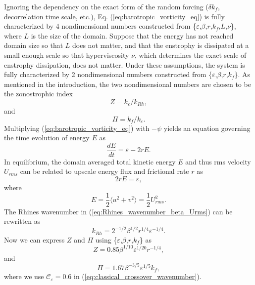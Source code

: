 \documentclass{ametsoc}
\begin{document}
Ignoring the dependency on the exact form of the random forcing 
($\delta k_f$, decorrelation time scale, etc.), Eq.
(\ref{eq:barotropic_vorticity_eq}) is fully characterized by 4 nondimensional
numbers constructed from \{$\varepsilon$,$\beta$,$r$,$k_{f}$,$L$,$\nu$\},
where $L$ is the size of the domain. Suppose that the energy has
not reached domain size so that $L$ does not matter, and that the
enstrophy is dissipated at a small enough scale so that hyperviscosity
$\nu$, which determines the exact scale of enstrophy dissipation,
does not matter. Under these assumptions, the system is fully characterized
by 2 nondimensional numbers constructed from \{$\varepsilon$,$\beta$,$r$,$k_{f}$\}.
As mentioned in the introduction, the two nondimensional numbers
are chosen to be the zonostrophic index 
\begin{equation}
Z=k_{\varepsilon}/k_{Rh},\label{eq:zono_idx_estimate}
\end{equation}
and
\[
\Pi=k_{f}/k_{\varepsilon}.
\]
Multiplying (\ref{eq:barotropic_vorticity_eq}) with $-\psi$ yields
an equation governing the time evolution of energy $E$ as
\begin{equation}
\frac{dE}{dt}=\varepsilon-2rE.\label{eq:energy_evolution_equation}
\end{equation}
In equilibrium, the domain averaged total kinetic energy $E$ and
thus rms velocity $U_{rms}$ can be related to upscale energy flux
and frictional rate $r$ as
\[
2rE=\varepsilon,
\]
where 
\[
E=\frac{1}{2}\langle u^{2}+v^{2}\rangle=\frac{1}{2}U_{rms}^{2}.
\]
The Rhines wavenumber in (\ref{eq:Rhines_wavenumber_beta_Urms}) can
be rewritten as
\begin{equation}
k_{Rh}=2^{-1/2}\beta^{1/2}r^{1/4}\varepsilon^{-1/4}.\label{eq:Rhines_wavenumber_beta_r_epsilon}
\end{equation}
Now we can express $Z$ and $\Pi$ using \{$\varepsilon$,$\beta$,$r$,$k_{f}$\}
as
\begin{equation}
Z=0.85\beta^{1/10}\varepsilon^{1/20}r^{-1/4},\label{eq:Z_estimate_in_work}
\end{equation}
and
\begin{equation}
\Pi=1.67\beta^{-3/5}\varepsilon^{1/5}k_{f},\label{eq:PI_estimate_in_work}
\end{equation}
where we use $\mathcal{\mathcal{C}_{\varepsilon}}=0.6$ in (\ref{eq:classical_crossover_wavenumber}).
\end{document}
